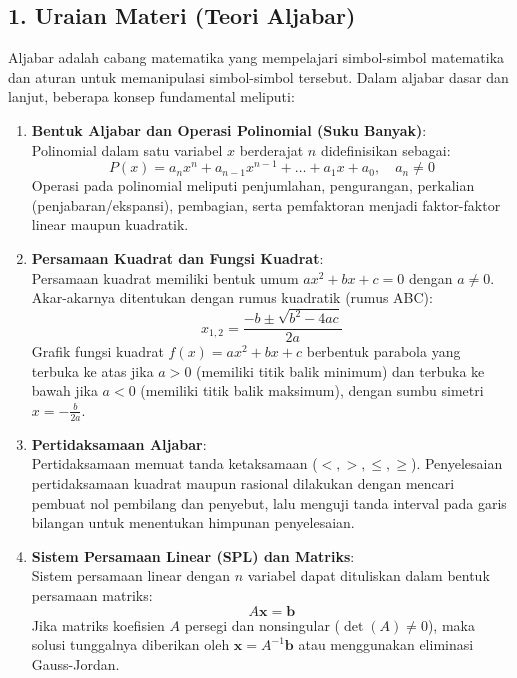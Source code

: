 \documentclass[11pt, a4paper]{article}
\begin{document}
\subsection*{1. Uraian Materi (Teori Aljabar)}

Aljabar adalah cabang matematika yang mempelajari simbol-simbol matematika dan aturan untuk memanipulasi simbol-simbol tersebut. Dalam aljabar dasar dan lanjut, beberapa konsep fundamental meliputi:

\begin{enumerate}
    \item \textbf{Bentuk Aljabar dan Operasi Polinomial (Suku Banyak)}: \\
    Polinomial dalam satu variabel $x$ berderajat $n$ didefinisikan sebagai:
    $$P(x) = a_n x^n + a_{n-1} x^{n-1} + \dots + a_1 x + a_0, \quad a_n \neq 0$$
    Operasi pada polinomial meliputi penjumlahan, pengurangan, perkalian (penjabaran/ekspansi), pembagian, serta pemfaktoran menjadi faktor-faktor linear maupun kuadratik.

    \item \textbf{Persamaan Kuadrat dan Fungsi Kuadrat}: \\
    Persamaan kuadrat memiliki bentuk umum $ax^2 + bx + c = 0$ dengan $a \neq 0$. Akar-akarnya ditentukan dengan rumus kuadratik (rumus ABC):
    $$x_{1,2} = \frac{-b \pm \sqrt{b^2 - 4ac}}{2a}$$
    Grafik fungsi kuadrat $f(x) = ax^2 + bx + c$ berbentuk parabola yang terbuka ke atas jika $a > 0$ (memiliki titik balik minimum) dan terbuka ke bawah jika $a < 0$ (memiliki titik balik maksimum), dengan sumbu simetri $x = -\frac{b}{2a}$.

    \item \textbf{Pertidaksamaan Aljabar}: \\
    Pertidaksamaan memuat tanda ketaksamaan ($<, >, \le, \ge$). Penyelesaian pertidaksamaan kuadrat maupun rasional dilakukan dengan mencari pembuat nol pembilang dan penyebut, lalu menguji tanda interval pada garis bilangan untuk menentukan himpunan penyelesaian.

    \item \textbf{Sistem Persamaan Linear (SPL) dan Matriks}: \\
    Sistem persamaan linear dengan $n$ variabel dapat dituliskan dalam bentuk persamaan matriks:
    $$A\mathbf{x} = \mathbf{b}$$
    Jika matriks koefisien $A$ persegi dan nonsingular ($\det(A) \neq 0$), maka solusi tunggalnya diberikan oleh $\mathbf{x} = A^{-1}\mathbf{b}$ atau menggunakan eliminasi Gauss-Jordan.
\end{enumerate}
\end{document}
